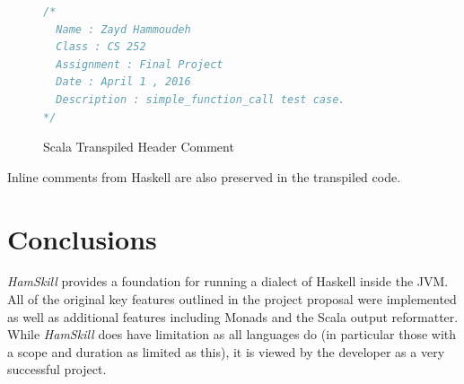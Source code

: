 \documentclass{report}
\begin{document}
\begin{figure}[H]
\begin{mdframed}
\begin{lstlisting}[language=Scala]
/*
  Name : Zayd Hammoudeh
  Class : CS 252
  Assignment : Final Project
  Date : April 1 , 2016
  Description : simple_function_call test case.
*/
\end{lstlisting}
\end{mdframed}
\caption{Scala Transpiled Header Comment}\label{fig:scalaHeaderComments}
\end{figure}

Inline comments from Haskell are also preserved in the transpiled code.

\section{Conclusions}

\textit{HamSkill} provides a foundation for running a dialect of Haskell inside the JVM.  All of the original key features outlined in the project proposal were implemented as well as additional features including Monads and the Scala output reformatter.  While \textit{HamSkill} does have limitation as all languages do (in particular those with a scope and duration as limited as this), it is viewed by the developer as a very successful project.

\pagebreak


\end{document}
